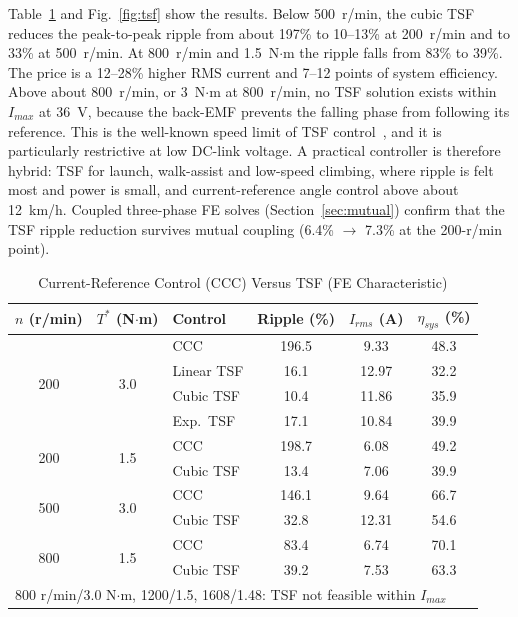 \documentclass[journal]{IEEEtran}
\begin{document}
Table~\ref{tab:tsf} and Fig.~\ref{fig:tsf} show the results. Below 500~r/min,
the cubic TSF reduces the peak-to-peak ripple from about 197\% to 10--13\% at
200~r/min and to 33\% at 500~r/min. At 800~r/min and 1.5~N$\cdot$m the ripple
falls from 83\% to 39\%. The price is a 12--28\% higher RMS current and 7--12
points of system efficiency. Above about 800~r/min, or 3~N$\cdot$m at
800~r/min, no TSF solution exists within $I_{max}$ at 36~V, because the back-EMF
prevents the falling phase from following its reference. This is the
well-known speed limit of TSF control~\cite{ye2015,xue2009}, and it is
particularly restrictive at low DC-link voltage. A practical controller is
therefore hybrid: TSF for launch, walk-assist and low-speed climbing, where
ripple is felt most and power is small, and current-reference angle control
above about 12~km/h. Coupled three-phase FE solves (Section~\ref{sec:mutual}) confirm that the
TSF ripple reduction survives mutual coupling (6.4\% $\rightarrow$ 7.3\% at the
200-r/min point).

\begin{table}[!t]
\caption{Current-Reference Control (CCC) Versus TSF (FE Characteristic)}
\label{tab:tsf}
\centering
\renewcommand{\arraystretch}{1.08}
\setlength{\tabcolsep}{2.6pt}
\begin{tabular}{c c l c c c}
\hline
$n$ (r/min) & $T^*$ (N$\cdot$m) & Control & Ripple (\%) & $I_{rms}$ (A) & $\eta_{sys}$ (\%)\\
\hline
\multirow{4}{*}{200} & \multirow{4}{*}{3.0} & CCC & 196.5 & 9.33 & 48.3\\
 & & Linear TSF & 16.1 & 12.97 & 32.2\\
 & & Cubic TSF & 10.4 & 11.86 & 35.9\\
 & & Exp.\ TSF & 17.1 & 10.84 & 39.9\\
\hline
\multirow{2}{*}{200} & \multirow{2}{*}{1.5} & CCC & 198.7 & 6.08 & 49.2\\
 & & Cubic TSF & 13.4 & 7.06 & 39.9\\
\hline
\multirow{2}{*}{500} & \multirow{2}{*}{3.0} & CCC & 146.1 & 9.64 & 66.7\\
 & & Cubic TSF & 32.8 & 12.31 & 54.6\\
\hline
\multirow{2}{*}{800} & \multirow{2}{*}{1.5} & CCC & 83.4 & 6.74 & 70.1\\
 & & Cubic TSF & 39.2 & 7.53 & 63.3\\
\hline
\multicolumn{6}{l}{800 r/min/3.0 N$\cdot$m, 1200/1.5, 1608/1.48: TSF not feasible within $I_{max}$}\\
\hline
\end{tabular}
\end{table}
\end{document}
